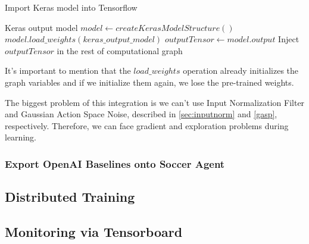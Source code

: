 \begin{algorithm}
	\caption{Import Keras model into Tensorflow}
	\begin{algorithmic} 
		\REQUIRE Keras output model
		\STATE $model \leftarrow createKerasModelStructure()$
		\STATE $model.load\_weights(keras\_output\_model)$
		\STATE $outputTensor \leftarrow model.output$
		\STATE Inject $outputTensor$ in the rest of computational graph
	\end{algorithmic}
	\label{importnetworkpseudocode}
\end{algorithm}

It's important to mention that the $load\_weights$ operation already initializes the graph variables and if we initialize them again, we lose the pre-trained weights.

The biggest problem of this integration is we can't use Input Normalization Filter and Gaussian Action Space Noise, described in \ref{sec:inputnorm} and \ref{gasp}, respectively. Therefore, we can face gradient and exploration problems during learning.

\subsubsection{Export OpenAI Baselines onto Soccer Agent}


\subsection{Distributed Training}

\subsection{Monitoring via Tensorboard}